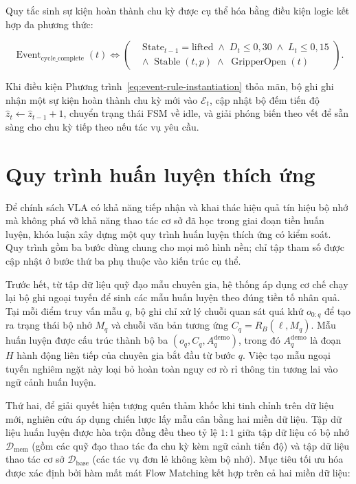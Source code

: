 Quy tắc sinh sự kiện hoàn thành chu kỳ được cụ thể hóa bằng điều kiện logic kết hợp đa phương thức:

\begin{equation}
\operatorname{Event}_{\mathrm{cycle\_complete}}(t) \iff
\left(
\begin{aligned}
&\text{State}_{t-1} = \text{lifted} \;\land\; D_t \le 0{,}30 \;\land\; L_t \le 0{,}15 \\
&\land\; \operatorname{Stable}(t, p) \;\land\; \operatorname{GripperOpen}(t)
\end{aligned}
\right).
\label{eq:event-rule-instantiation}
\end{equation}

Khi điều kiện Phương trình~\eqref{eq:event-rule-instantiation} thỏa mãn, bộ ghi ghi nhận một sự kiện hoàn thành chu kỳ mới vào $\mathcal E_t$, cập nhật bộ đếm tiến độ $\hat z_t \leftarrow \hat z_{t-1} + 1$, chuyển trạng thái FSM về $\text{idle}$, và giải phóng biến theo vết để sẵn sàng cho chu kỳ tiếp theo nếu tác vụ yêu cầu.

\section{Quy trình huấn luyện thích ứng}
\label{sec:adaptation}

Để chính sách VLA có khả năng tiếp nhận và khai thác hiệu quả tín hiệu bộ nhớ mà không phá vỡ khả năng thao tác cơ sở đã học trong giai đoạn tiền huấn luyện, khóa luận xây dựng một quy trình huấn luyện thích ứng có kiểm soát. Quy trình gồm ba bước dùng chung cho mọi mô hình nền; chỉ tập tham số được cập nhật ở bước thứ ba phụ thuộc vào kiến trúc cụ thể.

Trước hết, từ tập dữ liệu quỹ đạo mẫu chuyên gia, hệ thống áp dụng cơ chế chạy lại bộ ghi ngoại tuyến để sinh các mẫu huấn luyện theo đúng tiền tố nhân quả. Tại mỗi điểm truy vấn mẫu $q$, bộ ghi chỉ xử lý chuỗi quan sát quá khứ $o_{0:q}$ để tạo ra trạng thái bộ nhớ $M_q$ và chuỗi văn bản tương ứng $C_q = R_B(\ell, M_q)$. Mẫu huấn luyện được cấu trúc thành bộ ba $(o_q, C_q, A_q^{\mathrm{demo}})$, trong đó $A_q^{\mathrm{demo}}$ là đoạn $H$ hành động liên tiếp của chuyên gia bắt đầu từ bước $q$. Việc tạo mẫu ngoại tuyến nghiêm ngặt này loại bỏ hoàn toàn nguy cơ rò rỉ thông tin tương lai vào ngữ cảnh huấn luyện.

Thứ hai, để giải quyết hiện tượng quên thảm khốc khi tinh chỉnh trên dữ liệu mới, nghiên cứu áp dụng chiến lược lấy mẫu cân bằng hai miền dữ liệu. Tập dữ liệu huấn luyện được hòa trộn đồng đều theo tỷ lệ $1:1$ giữa tập dữ liệu có bộ nhớ $\mathcal D_{\mathrm{mem}}$ (gồm các quỹ đạo thao tác đa chu kỳ kèm ngữ cảnh tiến độ) và tập dữ liệu thao tác cơ sở $\mathcal D_{\mathrm{base}}$ (các tác vụ đơn lẻ không kèm bộ nhớ). Mục tiêu tối ưu hóa được xác định bởi hàm mất mát Flow Matching kết hợp trên cả hai miền dữ liệu:

